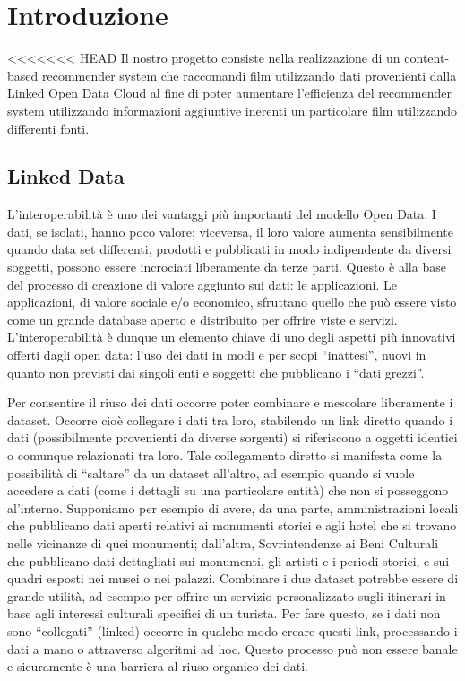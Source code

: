\section{Introduzione}

<<<<<<< HEAD
Il nostro progetto consiste nella realizzazione di un content-based recommender system che raccomandi film utilizzando dati provenienti dalla Linked Open Data Cloud al fine di poter aumentare l'efficienza del recommender system utilizzando informazioni aggiuntive inerenti un particolare film utilizzando differenti fonti.

\subsection{Linked Data}
L’interoperabilità è uno dei vantaggi più importanti del modello Open Data. I dati, se isolati, hanno poco valore; viceversa, il loro valore aumenta sensibilmente quando data set differenti, prodotti e pubblicati in modo indipendente da diversi soggetti, possono essere incrociati liberamente da terze parti. Questo è alla base del processo di creazione di valore aggiunto sui dati: le applicazioni. Le applicazioni, di valore sociale e/o economico, sfruttano quello che può essere visto come un grande database aperto e distribuito per offrire viste e servizi. L’interoperabilità è dunque un elemento chiave di uno degli aspetti più innovativi offerti dagli open data: l’uso dei dati in modi e per scopi “inattesi”, nuovi in quanto non previsti dai singoli enti e soggetti che pubblicano i “dati grezzi”.

Per consentire il riuso dei dati occorre poter combinare e mescolare liberamente i dataset. Occorre cioè collegare i dati tra loro, stabilendo un link diretto quando i dati (possibilmente provenienti da diverse sorgenti) si riferiscono a oggetti identici o comunque relazionati tra loro. Tale collegamento diretto si manifesta come la possibilità di “saltare” da un dataset all’altro, ad esempio quando si vuole accedere a dati (come i dettagli su una particolare entità) che non si posseggono al’interno.
Supponiamo per esempio di avere, da una parte, amministrazioni locali che pubblicano dati aperti relativi ai monumenti storici e agli hotel che si trovano nelle vicinanze di quei monumenti; dall’altra, Sovrintendenze ai Beni Culturali che pubblicano dati dettagliati sui monumenti, gli artisti e i periodi storici, e sui quadri esposti nei musei o nei palazzi.
Combinare i due dataset potrebbe essere di grande utilità, ad esempio per offrire un servizio personalizzato sugli itinerari in base agli interessi culturali specifici di un turista.
Per fare questo, se i dati non sono “collegati” (linked) occorre in qualche modo creare questi link, processando i dati a mano o attraverso algoritmi ad hoc. Questo processo può non essere banale e sicuramente è una barriera al riuso organico dei dati.

